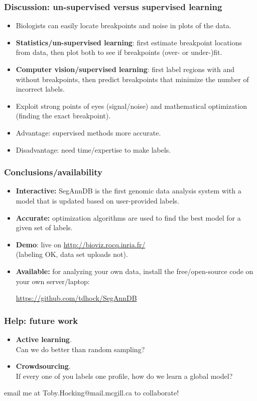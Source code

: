 \documentclass{beamer}
\begin{document}
  \begin{frame}
    \frametitle{Discussion: un-supervised versus supervised learning}
    \begin{itemize}
    \item Biologists can easily locate breakpoints and noise in plots
      of the data.
    \item \textbf{Statistics/un-supervised learning}: 
      first estimate breakpoint locations from data,
      then plot both to see if breakpoints (over- or under-)fit.
    \item \textbf{Computer vision/supervised learning}:
      first label regions with and without breakpoints, 
      then predict breakpoints that minimize the number of incorrect labels.
    \item Exploit strong points of eyes (signal/noise) and
      mathematical optimization (finding the exact breakpoint).
    \item Advantage: supervised methods more accurate.
    \item Disadvantage: need time/expertise to make labels.
    \end{itemize}    
  \end{frame}

  \begin{frame}
    \frametitle{Conclusions/availability}
    \begin{itemize}
    \item \textbf{Interactive:} SegAnnDB is the first genomic data
      analysis system with a model that is updated based on
      user-provided labels.
    \item \textbf{Accurate:} optimization algorithms are used to find
      the best model for a given set of labels.
    \item \textbf{Demo}: live on \url{http://bioviz.rocq.inria.fr/}\\
      (labeling OK, data set uploads not).
    \item \textbf{Available:} for analyzing your own data, install the
      free/open-source code on your own server/laptop:

      \url{https://github.com/tdhock/SegAnnDB}
    \end{itemize}
  \end{frame}

  \begin{frame}
    \frametitle{Help: future work}

    \begin{itemize}
    \item \textbf{Active learning}.\\
      Can we do better than random sampling?
    \item \textbf{Crowdsourcing}.\\
      If every one of you labels one profile, how do we learn a global
      model?
    \end{itemize}

    email me at Toby.Hocking@mail.mcgill.ca to collaborate!

  \end{frame}
\end{document}
